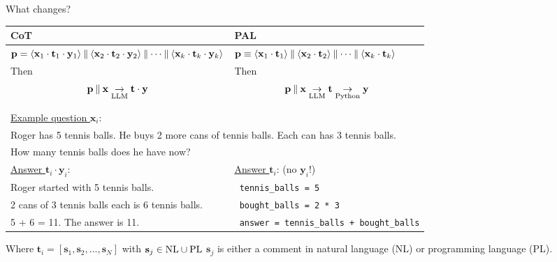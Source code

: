 \begin{frame}[shrink=5]{What changes?}

\begin{table}
\small
\begin{tabular}{@{}p{} | p{}@{}}
\toprule
\textbf{CoT} & \textbf{PAL} \\
\midrule
\(\mathbf{p} = \langle \mathbf{x}_1 \cdot \mathbf{t}_1 \cdot \mathbf{y}_1 \rangle \concat \langle \mathbf{x}_2 \cdot \mathbf{t}_2 \cdot \mathbf{y}_2 \rangle \concat \dots \concat \langle \mathbf{x}_k \cdot \mathbf{t}_k \cdot \mathbf{y}_k \rangle\) & \(\mathbf{p} \equiv \langle \mathbf{x}_1 \cdot \mathbf{t}_1 \rangle \concat \langle \mathbf{x}_2 \cdot \mathbf{t}_2 \rangle \concat \dots \concat \langle \mathbf{x}_k \cdot \mathbf{t}_k \rangle\) \\
Then \[\mathbf{p} \mathbin{\|} \mathbf{x} \underset{\text{LLM}}{\rightarrow} \mathbf{t} \cdot \mathbf{y}\] & Then \[\mathbf{p} \mathbin{\|} \mathbf{x} \underset{\text{LLM}}{\rightarrow} \mathbf{t} \underset{\text{Python}}{\rightarrow} \mathbf{y}\]\\
\midrule
\multicolumn{2}{l}{\underline{Example question \(\mathbf{x}_i\)}: } \\
\multicolumn{2}{l}{Roger has 5 tennis balls. He buys 2 more cans of tennis balls. Each can has 3 tennis balls.} \\
\multicolumn{2}{l}{How many tennis balls does he have now?} \\
\midrule
\underline{Answer \(\mathbf{t}_i \cdot \mathbf{y}_i\)}:  & \underline{Answer \(\mathbf{t}_i\)}: (no \(\mathbf{y}_i\)!)\\
Roger started with 5 tennis balls. & \texttt{\color{teal} tennis\_balls \color{black} = \color{blue} 5}\\
2 cans of 3 tennis balls each is 6 tennis balls. & \texttt{\color{teal} bought\_balls \color{black} = \color{blue} 2 \color{black} * \color{blue} 3}\\
5 + 6 = 11. The answer is 11.  & \texttt{\color{teal} answer \color{black} = \color{teal} tennis\_balls \color{black} + \color{teal} bought\_balls}
\end{tabular}
\end{table}
\begin{block}{Where \(\mathbf{t}_i = [\mathbf{s}_1, \mathbf{s}_2,...,\mathbf{s}_N]\) with \(\mathbf{s}_j \in \textup{NL} \cup \textup{PL}\)}
  \(\mathbf{s}_j\) is either a comment in natural language (NL) or programming language (PL).
\end{block}


\end{frame}
